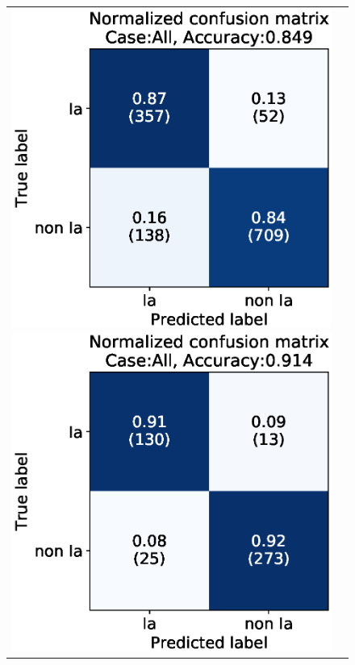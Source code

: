 \documentclass[useamsfonts]{pasj01}
\begin{document}
\begin{figure}[htbp]
    \begin{tabular}{cc}
        \begin{minipage}{0.5\hsize}
            \begin{center}
                \includegraphics[width=\columnwidth]{figures/10_CM_abs-mag_scaled-flux_w-mixup_remove-y_predictions_test_2_Flagall_all.eps}
            \end{center}
        \end{minipage}
        \begin{minipage}{0.5\hsize}
            \begin{center}
                \includegraphics[width=\columnwidth]{figures/10_CM_abs-mag_scaled-flux_w-mixup_remove-y_predictions_test_2_Flagall_noedge_spec.eps}

\end{center}
\end{minipage}
\end{tabular}
\end{figure}
\end{document}

